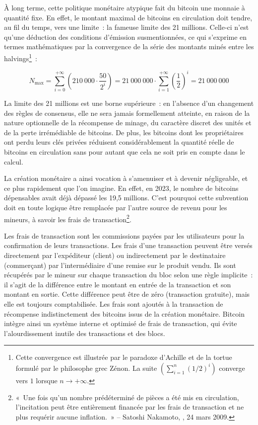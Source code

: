 À long terme, cette politique monétaire atypique fait du bitcoin une monnaie à quantité fixe. En effet, le montant maximal de bitcoins en circulation doit tendre, au fil du temps, vers une limite~: la fameuse limite des 21 millions. Celle-ci n'est qu'une déduction des conditions d'émission susmentionnées, ce qui s'exprime en termes mathématiques par la convergence de la série des montants minés entre les halvings\footnote{Cette convergence est illustrée par le paradoxe d'Achille et de la tortue formulé par le philosophe grec Zénon. La suite $\left( \sum_{i=1}^{n} (1/2)^i \right)$ converge vers $1$ lorsque $n\to+\infty$.}~:

{ \footnotesize
\[
N_{\mathrm{max}} = \sum_{i=0}^{+\infty} \left( {210~000 \cdot \frac{50}{2^i}} \right) = 21~000~000 \cdot \sum_{i=1}^{+\infty} \left(\frac{1}{2}\right)^i = 21~000~000
\]
}

La limite des 21 millions est une borne supérieure~: en l'absence d'un changement des règles de consensus, elle ne sera jamais formellement atteinte, en raison de la nature optionnelle de la récompense de minage, du caractère discret des unités et de la perte irrémédiable de bitcoins. De plus, les bitcoins dont les propriétaires ont perdu leurs clés privées réduisent considérablement la quantité réelle de bitcoins en circulation sans pour autant que cela ne soit pris en compte dans le calcul.

La création monétaire a ainsi vocation à s'amenuiser et à devenir négligeable, et ce plus rapidement que l'on imagine. En effet, en 2023, le nombre de bitcoins dépensables avait déjà dépassé les 19,5 millions. C'est pourquoi cette subvention doit en toute logique être remplacée par l'autre source de revenu pour les mineurs, à savoir les frais de transaction\footnote{«~Une fois qu'un nombre prédéterminé de pièces a été mis en circulation, l'incitation peut être entièrement financée par les frais de transaction et ne plus requérir aucune inflation.~» -- Satoshi Nakamoto, , 24 mars 2009.}.

Les frais de transaction sont les commissions payées par les utilisateurs pour la confirmation de leurs transactions. Les frais d'une transaction peuvent être versés directement par l'expéditeur (client) ou indirectement par le destinataire (commerçant) par l'intermédiaire d'une remise sur le produit vendu. Ils sont récupérés par le mineur sur chaque transaction du bloc selon une règle implicite~: il s'agit de la différence entre le montant en entrée de la transaction et son montant en sortie. Cette différence peut être de zéro (transaction gratuite), mais elle est toujours comptabilisée. Les frais sont ajoutés à la transaction de récompense indistinctement des bitcoins issus de la création monétaire. Bitcoin intègre ainsi un système interne et optimisé de frais de transaction, qui évite l'alourdissement inutile des transactions et des blocs.

